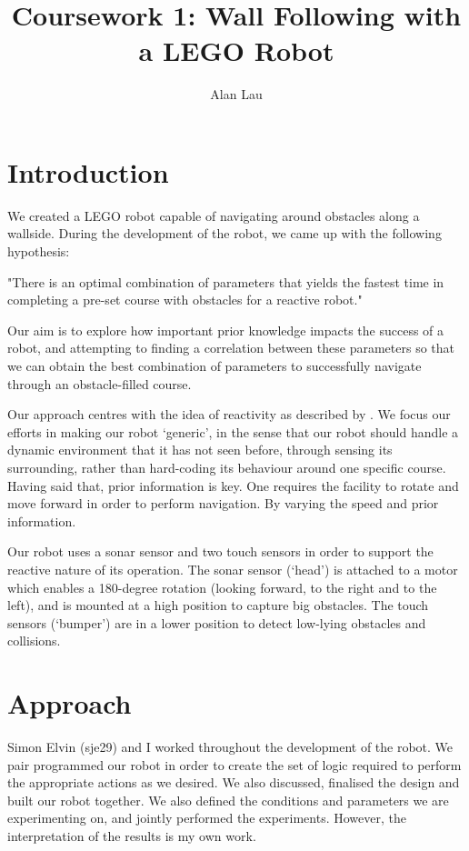 \documentclass[a4paper,12pt]{article}
\title{Coursework 1:  Wall Following with a LEGO Robot}
\author{Alan Lau}
\begin{document}
\maketitle

\section{Introduction}
We created a LEGO robot capable of navigating around obstacles along a wallside. During the development of the robot, we came up with the following hypothesis:

\begin{center}
    "There is an optimal combination of parameters that yields the fastest time in completing a pre-set course with obstacles for a reactive robot." 
\end{center}

Our aim is to explore how important prior knowledge impacts the success of a robot, and attempting to finding a correlation between these parameters so that we can obtain the best combination of parameters to successfully navigate through an obstacle-filled course.

Our approach centres with the idea of reactivity as described by \cite{brooks1991}. We focus our efforts in making our robot `generic', in the sense that our robot should handle a dynamic environment that it has not seen before, through sensing its surrounding, rather than hard-coding its behaviour around one specific course. Having said that, prior information is key. One requires the facility to rotate and move forward in order to perform navigation. By varying the speed and prior information. 

Our robot uses a sonar sensor and two touch sensors in order to support the reactive nature of its operation. The sonar sensor (`head') is attached to a motor which enables a 180-degree rotation (looking forward, to the right and to the left), and is mounted at a high position to capture big obstacles. The touch sensors (`bumper') are in a lower position to detect low-lying obstacles and collisions. 


\section{Approach}
Simon Elvin (sje29) and I worked throughout the development of the robot. We pair programmed our robot in order to create the set of logic required to perform the appropriate actions as we desired. We also discussed, finalised the design and built our robot together. We also defined the conditions and parameters we are experimenting on, and jointly performed the experiments. However, the interpretation of the results is my own work.
\end{document}
